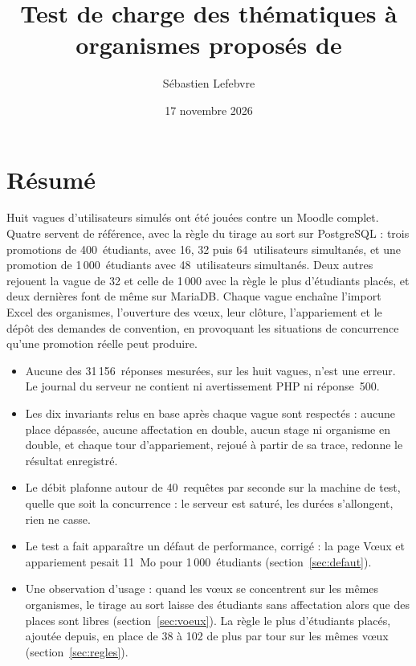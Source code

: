 \documentclass[11pt,a4paper]{article}
\title{Test de charge des thématiques à organismes proposés de \code{mod_stage}}
\author{Sébastien Lefebvre}
\date{17 novembre 2026}
\begin{document}
\maketitle

\section{Résumé}

Huit vagues d'utilisateurs simulés ont été jouées contre un Moodle complet. Quatre servent de
référence, avec la règle du tirage au sort sur PostgreSQL : trois promotions de 400~étudiants, avec
16, 32 puis 64~utilisateurs simultanés, et une promotion de 1\,000~étudiants avec
48~utilisateurs simultanés. Deux autres rejouent la vague de 32 et celle de 1\,000 avec la règle
\og le plus d'étudiants placés\fg{}, et deux dernières font de même sur MariaDB. Chaque vague enchaîne l'import Excel des organismes, l'ouverture
des vœux, leur clôture,
l'appariement et le dépôt des demandes de convention, en provoquant les situations de concurrence
qu'une promotion réelle peut produire.

\begin{itemize}
  \item Aucune des 31\,156~réponses mesurées, sur les huit vagues, n'est une erreur. Le journal du serveur ne contient ni
    avertissement PHP ni réponse~500.
  \item Les dix invariants relus en base après chaque vague sont respectés : aucune place
    dépassée, aucune affectation en double, aucun stage ni organisme en double, et chaque tour
    d'appariement, rejoué à partir de sa trace, redonne le résultat enregistré.
  \item Le débit plafonne autour de 40~requêtes par seconde sur la machine de test, quelle que
    soit la concurrence : le serveur est saturé, les durées s'allongent, rien ne casse.
  \item Le test a fait apparaître un défaut de performance, corrigé : la page \og Vœux et
    appariement\fg{} pesait 11~Mo pour 1\,000~étudiants (section~\ref{sec:defaut}).
  \item Une observation d'usage : quand les vœux se concentrent sur les mêmes organismes, le tirage
    au sort laisse des étudiants sans affectation alors que des places sont libres
    (section~\ref{sec:voeux}). La règle \og le plus d'étudiants placés\fg{}, ajoutée depuis, en
    place de 38 à 102 de plus par tour sur les mêmes vœux (section~\ref{sec:regles}).
\end{itemize}
\end{document}
